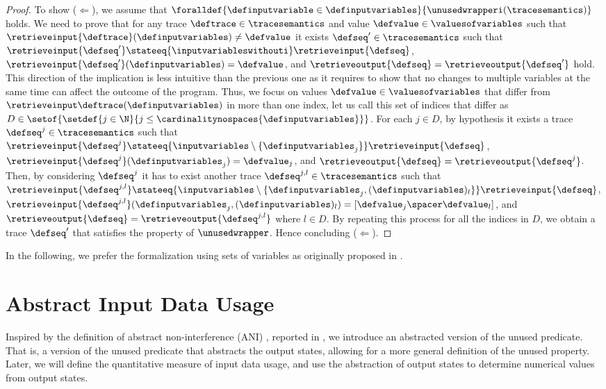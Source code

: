 \begin{proof}
  To show ($\Leftarrow$), we assume that $\foralldef{\definputvariable \in \definputvariables}{\unusedwrapperi(\tracesemantics)}$ holds.
  We need to prove that for any trace $\deftrace\in\tracesemantics$ and value $\defvalue\in \valuesofvariables$ such that $\retrieveinput{\deftrace}(\definputvariables) \neq \defvalue$ it exists $\defseq'\in\tracesemantics$ such that $\retrieveinput{\defseq'} \stateeq{\inputvariableswithouti} \retrieveinput{\defseq}$, $
    \retrieveinput{\defseq'}(\definputvariables) = \defvalue$, and $
    \retrieveoutput{\defseq} = \retrieveoutput{\defseq'}$ hold.
  This direction of the implication is less intuitive than the previous one as it requires to show that no changes to multiple variables at the same time can affect the outcome of the program.
  Thus, we focus on values $\defvalue\in\valuesofvariables$ that differ from $\retrieveinput\deftrace(\definputvariables)$ in more than one index, let us call this set of indices that differ as $D\in\setof{\setdef{j\in\N}{j\le\cardinalitynospaces{\definputvariables}}}$. For each $j\in D$, by hypothesis it exists a trace $\defseq^j\in\tracesemantics$ such that $\retrieveinput{\defseq^j} \stateeq{\inputvariables \setminus{\{\definputvariables_j\}}} \retrieveinput{\defseq}$, $
  \retrieveinput{\defseq^j}(\definputvariables_j) = \defvalue_j$, and $
  \retrieveoutput{\defseq} = \retrieveoutput{\defseq^j}$.
  Then, by considering $\defseq^j$ it has to exist another trace $\defseq^{j,l}\in\tracesemantics$ such that $\retrieveinput{\defseq^{j,l}} \stateeq{\inputvariables \setminus{\{\definputvariables_j, (\definputvariables)_l\}}} \retrieveinput{\defseq}$, $
  \retrieveinput{\defseq^{j,l}}(\definputvariables_j, (\definputvariables)_l) = [\defvalue_j\spacer \defvalue_l]$, and $
  \retrieveoutput{\defseq} = \retrieveoutput{\defseq^{j,l}}$ where $l\in D$.
  By repeating this process for all the indices in $D$, we obtain a trace $\defseq'$ that satisfies the property of $\unusedwrapper$. Hence concluding ($\Leftarrow$).
\end{proof}

In the following, we prefer the formalization using sets of variables as originally proposed in .

\section{Abstract Input Data Usage}

Inspired by the definition of abstract non-interference (ANI) , reported in ,
we introduce an abstracted version of the unused predicate.
That is, a version of the unused predicate that abstracts the output states, allowing for a more general definition of the unused property.
Later, we will define the quantitative measure of input data usage, and use the abstraction of output states to determine numerical values from output states.

